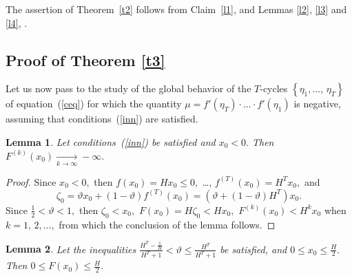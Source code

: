 \documentclass[12pt,a4paper]{amsart}
\newtheorem{lemma}{Lemma}
\begin{document}
The assertion of Theorem~\ref{t2} follows from Claim~\ref{l1}, and Lemmas \ref{l2}, \ref{l3} and \ref{l4}, .

\subsection{Proof of Theorem \ref{t3}} 

Let us now pass to the study of the global behavior of the $T$-cycles $\left\{\eta_1,\ldots,\,\eta_T\right\}$ of equation~(\ref{ceq}) 
for which the quantity $\mu = f'(\eta_T)\cdot\ldots\cdot f'(\eta_1)$ is negative, assuming that conditions~(\ref{inn}) are satisfied.

\begin{lemma}\label{l5}
Let conditions~(\ref{inn}) be satisfied and $x_0<0.$ Then \\ $F^{(k)}(x_0)\xrightarrow[k\rightarrow\infty]{}-\infty.$  
\end{lemma}

\begin{proof}
Since $x_0<0,$ then $f(x_0)=Hx_0\leq 0,$ \ldots, $f^{(T)}(x_0)=H^T x_0,$ and 
$$
\zeta_0=\vartheta x_0 + (1-\vartheta)f^{(T)}(x_0)=\left(\vartheta + (1 - \vartheta) H^T \right)x_0.
$$
Since $\frac12<\vartheta<1,$ then $\zeta_0<x_0,$ $F(x_0)=H\zeta_0<H x_0,$ $F^{(k)}(x_0)<H^k x_0$ when $k=1,\,2,\ldots,$ 
from which the conclusion of the lemma follows.
\end{proof}

\begin{lemma}\label{l6}
Let the inequalities $\frac{H^T-\frac{1}{H}}{H^T+1}<\vartheta \leq \frac{H^T}{H^T+1}$ be satisfied, and $0\leq x_0 \leq \frac{H}{2}.$ 
Then $0\leq F(x_0)\leq \frac{H}{2}.$  
\end{lemma}
\end{document}
